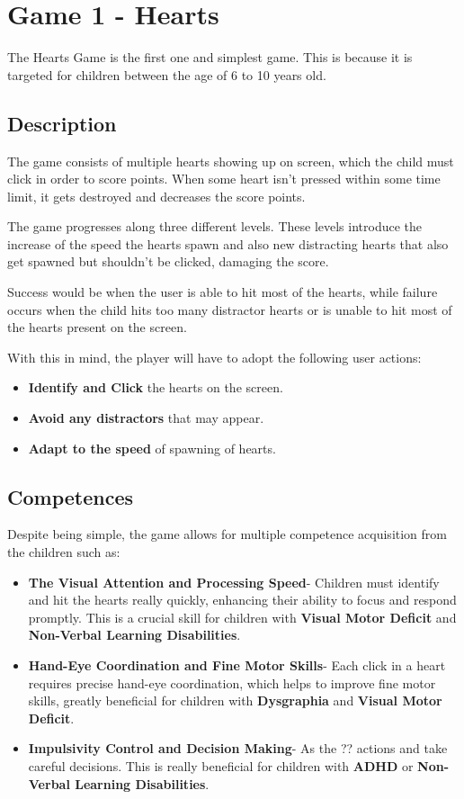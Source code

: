 \newpage
\section{Game 1 - Hearts}
\label{c3hearts}

The Hearts Game is the first one and simplest game. This is because it is targeted for children between the age of 6 to 10 years old.

\subsection*{Description}
The game consists of multiple hearts showing up on screen, which the child must click in order to score points. When some heart isn't pressed within some time limit, it gets destroyed and decreases the score points.

The game progresses along three different levels. These levels introduce the increase of the speed the hearts spawn and also new distracting hearts that also get spawned but shouldn't be clicked, damaging the score.

Success would be when the user is able to hit most of the hearts, while failure occurs when the child hits too many distractor hearts or is unable to hit most of the hearts present on the screen.

With this in mind, the player will have to adopt the following user actions:

\begin{itemize}
    \item \textbf{Identify and Click} the hearts on the screen.
    \item \textbf{Avoid any distractors} that may appear.
    \item \textbf{Adapt to the speed} of spawning of hearts.
\end{itemize}

\subsection*{Competences}
Despite being simple, the game allows for multiple competence acquisition from the children such as:

\begin{itemize}
    \item \textbf{The Visual Attention and Processing Speed}- Children must identify and hit the hearts really quickly, enhancing their ability to focus and respond promptly. This is a crucial skill for children with \textbf{Visual Motor Deficit} and \textbf{Non-Verbal Learning Disabilities}.
    \item \textbf{Hand-Eye Coordination and Fine Motor Skills}- Each click in a heart requires precise hand-eye coordination, which helps to improve fine motor skills, greatly beneficial for children with \textbf{Dysgraphia} and \textbf{Visual Motor Deficit}.
    \item \textbf{Impulsivity Control and Decision Making}- As the ?? actions and take careful decisions. This is really beneficial for children with \textbf{ADHD} or \textbf{Non-Verbal Learning Disabilities}.
    
\end{itemize}

